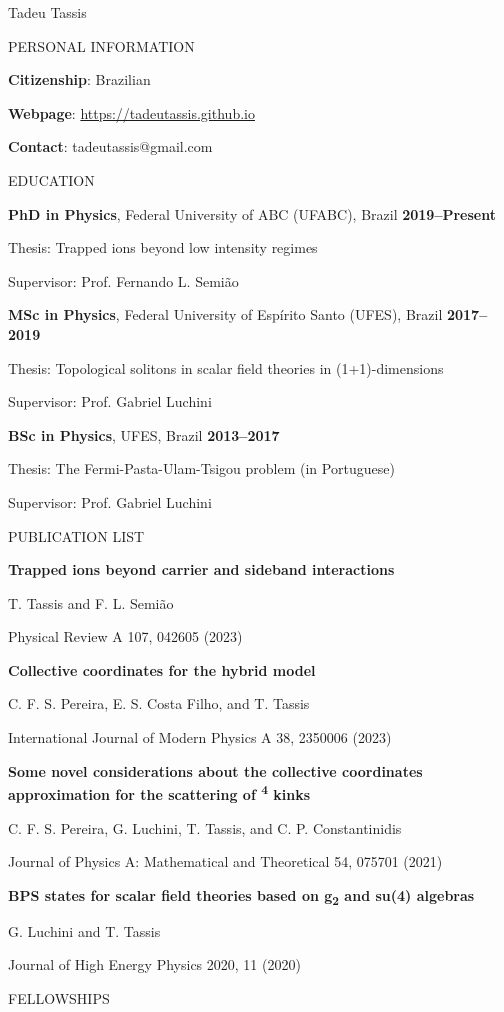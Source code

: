\documentclass[11pt]{article}
\newcommand{\linesep}{\vspace*{1em}}
\newcommand{\MyTitle}[1]{
    {\fontfamily{cmbr} \fontsize{36}{48} \selectfont \color{Indigo} #1} \par
    \vspace*{1em}
}
\newcommand{\MySection}[1]{
    \vspace*{2em}
    {\fontfamily{cmbr} \large \color{Indigo} \uppercase{#1} \hrulefill} \par
    \vspace*{1em}
}
\newcommand{\InfoItem}[2]{
    \textbf{#1}: #2 \par
}
\newcommand{\EduItem}[6]{
    \textbf{#1}, #2, #3 \hfill \textbf{#4} \par
    {\small Thesis: #5 \par
    Supervisor: #6} \par
}
\newcommand{\PubItem}[3]{
    \textbf{#1} \par
    {\small #2 \par
    #3} \par
}
\begin{document}
\MyTitle{Tadeu Tassis}

\MySection{Personal information}

\InfoItem{Citizenship}{Brazilian}
\InfoItem{Webpage}{\url{https://tadeutassis.github.io}}
\InfoItem{Contact}{tadeutassis@gmail.com}

\MySection{Education}

\EduItem{PhD in Physics}
{Federal University of ABC (UFABC)}
{Brazil}
{2019--Present}
{Trapped ions beyond low intensity regimes}
{Prof. Fernando L. Semião}

\linesep

\EduItem{MSc in Physics}
{Federal University of Espírito Santo (UFES)}
{Brazil}
{2017--2019}
{Topological solitons in scalar field theories in (1+1)-dimensions}
{Prof. Gabriel Luchini}

\linesep

\EduItem{BSc in Physics}
{UFES}
{Brazil}
{2013--2017}
{The Fermi-Pasta-Ulam-Tsigou problem (in Portuguese)}
{Prof. Gabriel Luchini}

\MySection{Publication list}

\PubItem{Trapped ions beyond carrier and sideband interactions}
{T. Tassis and F. L. Semião}
{Physical Review A 107, 042605 (2023)}

\linesep

\PubItem{Collective coordinates for the hybrid model}
{C. F. S. Pereira, E. S. Costa Filho, and T. Tassis}
{International Journal of Modern Physics A 38, 2350006 (2023)}

\linesep

\PubItem{Some novel considerations about the collective coordinates approximation for the scattering of \textphi \textsuperscript{4} kinks}
{C. F. S. Pereira, G. Luchini, T. Tassis, and C. P. Constantinidis}
{Journal of Physics A: Mathematical and Theoretical 54, 075701 (2021)}

\linesep

\PubItem{BPS states for scalar field theories based on g\textsubscript{2} and su(4) algebras}
{G. Luchini and T. Tassis}
{Journal of High Energy Physics 2020, 11 (2020)}

\MySection{Fellowships}
\end{document}
